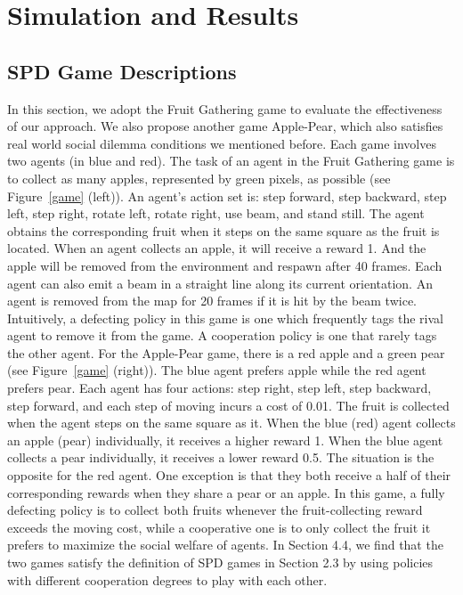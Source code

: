 \documentclass{article}
\begin{document}
\section{Simulation and Results}
\subsection{SPD Game Descriptions}
In this section, we adopt the Fruit Gathering game \cite{leibo2017multi} to evaluate the effectiveness of our approach. We also propose another game Apple-Pear, which also satisfies real world social dilemma conditions we mentioned before. Each game involves two agents (in blue and red). The task of an agent in the Fruit Gathering game is to collect as many apples, represented by green pixels, as possible (see Figure~\ref{game} (left)). An agent's action set is: step forward, step backward, step left, step right, rotate left, rotate right, use beam, and stand still.
The agent obtains the corresponding fruit when it steps on the same square as the fruit is located.
When an agent collects an apple, it will receive a reward 1. And the apple will be removed from the environment and respawn after 40 frames. Each agent can also emit a beam in a straight line along its current orientation. An agent is removed from the map for 20 frames if it is hit by the beam twice. Intuitively, a defecting policy in this game is one which frequently tags the rival agent to remove it from the game. A cooperation policy is one that rarely tags the other agent.
For the Apple-Pear game, there is a red apple and a green pear (see Figure~\ref{game} (right)). The blue agent prefers apple while the red agent prefers pear. Each agent has four actions: step right, step left, step backward, step forward, and each step of moving incurs a cost of 0.01.
The fruit is collected when the agent steps on the same square as it.
When the blue (red) agent collects an apple (pear) individually, it receives a higher reward 1. When the blue agent collects a pear individually, it receives a lower reward 0.5. The situation is the opposite for the red agent. One exception is that they both receive a half of their corresponding rewards when they share a pear or an apple. In this game, a fully defecting policy is to collect both fruits whenever the fruit-collecting reward exceeds the moving cost, while a cooperative one is to only collect the fruit it prefers to maximize the social welfare of agents. In Section 4.4, we find that the two games satisfy the definition of SPD games in Section 2.3 by using policies with different cooperation degrees to play with each other.
\end{document}
